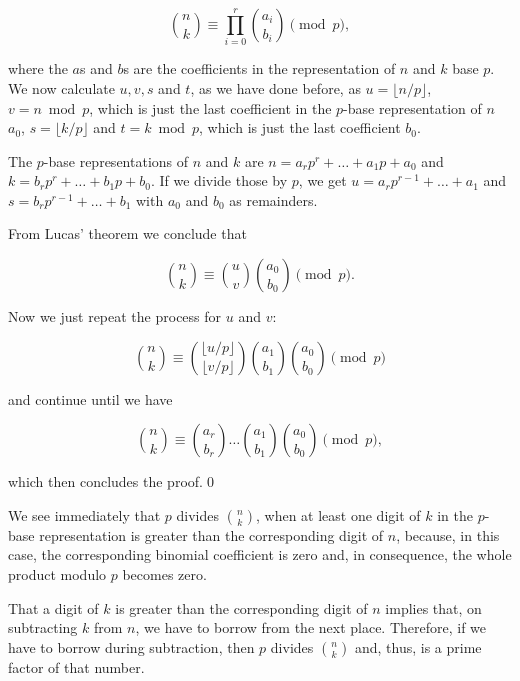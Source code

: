 \documentclass[tikz]{scrreprt}
\begin{document}
\begin{equation}
\binom{n}{k} \equiv \prod_{i=0}^{r}{\binom{a_i}{b_i}} \pmod{p},
\end{equation}

where the $a$s and $b$s are the coefficients in the
representation of $n$ and $k$ base $p$.
We now calculate $u,v,s$ and $t$, as we have done
before, as 
$u = \lfloor n/p\rfloor$,
$v = n \bmod p$, which is just the last coefficient 
in the $p$-base representation of $n$ $a_0$,
$s = \lfloor k/p\rfloor$ and
$t = k \bmod p$, which is just the last coefficient $b_0$.

The $p$-base representations of $n$ and $k$ are
$n = a_rp^r + \dots + a_1p + a_0$ and
$k = b_rp^r + \dots + b_1p + b_0$. 
If we divide those by $p$, we get
$u = a_rp^{r-1} + \dots + a_1$ and
$s = b_rp^{r-1} + \dots + b_1$
with $a_0$ and $b_0$ as remainders.

From Lucas' theorem we conclude that

\begin{equation}
\binom{n}{k} \equiv \binom{u}{v}\binom{a_0}{b_0} \pmod{p}.
\end{equation}

Now we just repeat the process for $u$ and $v$:

\begin{equation}
\binom{n}{k} \equiv \binom{\lfloor u/p\rfloor}
                          {\lfloor v/p\rfloor}
                    \binom{a_1}{b_1}
                    \binom{a_0}{b_0} \pmod{p}
\end{equation}

and continue until we have

\begin{equation}\label{eq:lucasCor}
\binom{n}{k} \equiv \binom{a_r}{b_r}
                    \dots
                    \binom{a_1}{b_1}
                    \binom{a_0}{b_0} \pmod{p},
\end{equation}

which then concludes the proof.\qed

We see immediately that $p$ divides
$\binom{n}{k}$, when at least one
digit of $k$ in the $p$-base representation
is greater than the corresponding
digit of $n$, because, in this case,
the corresponding binomial coefficient
is zero and, in consequence, the whole
product modulo $p$ becomes zero.

That a digit of $k$ is greater than
the corresponding digit of $n$ implies
that, on subtracting $k$ from $n$,
we have to borrow from the next place.
Therefore, if we have to borrow
during subtraction, then $p$ divides
$\binom{n}{k}$ and, thus, is a prime
factor of that number.
\end{document}
